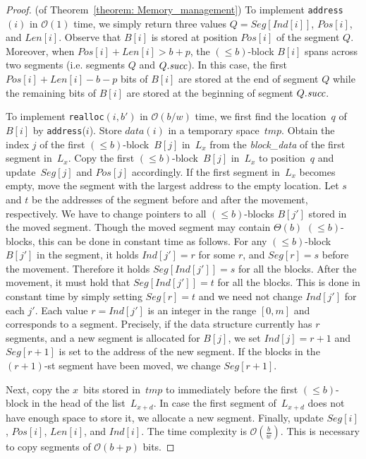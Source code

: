 \documentclass{llncs}
\newcommand{\Order}{\mathcal{O}}
\begin{document}
\begin{proof} (of Theorem~\ref{theorem: Memory_management})
To implement \texttt{address}$(i)$ in $\Order(1)$ time, 
we simply return three values $Q = Seg[Ind[i]]$, $Pos[i]$, and $Len[i]$.
Observe that $B[i]$ is stored at position $Pos[i]$ of the segment $Q$.
Moreover, when $Pos[i]+Len[i]>b+p$, the $(\leq b)$-block $B[i]$ spans
across two segments (i.e. segments $Q$ and $Q.\emph{succ}$).
In this case, the first $Pos[i]+Len[i]-b-p$ bits of $B[i]$ are
stored at the end of segment $Q$ while
the remaining bits of $B[i]$ are stored
at the beginning of segment $Q.\emph{succ}$.

To implement \texttt{realloc}$(i,b')$ in $\Order(b/w)$ time, we first find the
location~$q$ of $B[i]$ by \texttt{address}($i$).
Store $data(i)$ in a temporary space~$tmp$.
Obtain the index $j$ of the first $(\leq b)$-block~$B[j]$ in~$L_{x}$
from the \emph{block\_data} of the first segment in~$L_{x}$.
Copy the first $(\leq b)$-block~$B[j]$ in~$L_{x}$ to position~$q$ and
update~$Seg[j]$ and $Pos[j]$ accordingly.
If the first segment in~$L_{x}$ becomes empty, move the segment
with the largest address to the empty location.
Let $s$ and $t$ be the addresses of the segment before and after the movement,
respectively.
We have to change pointers to all $(\leq b)$-blocks $B[j']$
stored in the moved segment.  Though the moved segment may contain $\Theta(b)$
$(\leq b)$-blocks, this can be done in constant time as follows.
For any $(\leq b)$-block $B[j']$ in the segment, it holds $Ind[j'] = r$ for some
$r$, and $Seg[r] = s$ before the movement.
Therefore it holds $Seg[Ind[j']] = s$ for all the blocks.
After the movement, it must hold that $Seg[Ind[j']] = t$ for all the blocks.
This is done in constant time by simply setting $Seg[r] = t$ 
and we need not change $Ind[j']$ for each $j'$.
Each value $r = Ind[j']$ is an integer in the range $[0,m]$ and corresponds to
a segment.  Precisely,  if the data structure currently has $r$ segments, and
a new segment is allocated for $B[j]$, we set $Ind[j] = r+1$ and $Seg[r+1]$
is set to the address of the new segment.  If the blocks in the $(r+1)$-st segment
have been moved, we change $Seg[r+1]$.  

Next, copy the $x$~bits stored in~$tmp$ to immediately before the first
$(\leq b)$-block in the head of the list~$L_{x+d}$.
In case the first segment of~$L_{x+d}$ does not have enough space to store
it, we allocate a new segment.
Finally, update $Seg[i]$, $Pos[i]$, $Len[i]$, and $Ind[i]$.
The time complexity is $\Order(\frac{b}{w})$.  This is necessary to copy
segments of $\Order(b+p)$ bits.


\end{proof}
\end{document}
